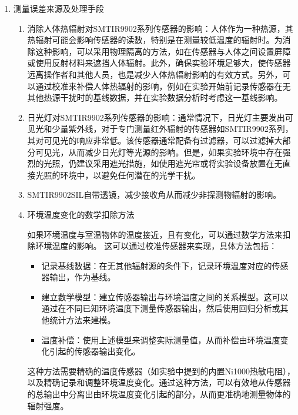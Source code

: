 \documentclass[dvipsnames, svgnames,a4paper,11pt]{article}
\begin{document}
\begin{enumerate}
\begin{enumerate}
			\item 根据讲义中的内容，尽管按照物理定律，处于室温的物体也会发出热辐射，但是当物体的温度和环境温度相同时，物体的辐射和吸收达到平衡。此时，传感器可能测得的辐射强度与环境的背景辐射强度相等，因此在没有温差的情况下，辐射体和传感器之间没有净能量交换，导致传感器输出的电压信号为零。实际上，这是因为传感器主要测量的是温差引起的辐射强度变化，而非绝对辐射强度。
			
			\item 要直接测量处于室温的物体的辐射强度，理想情况下，传感器外壳（环境）的温度应该低于被测物体的温度，以便产生足够的温差，从而使传感器能够检测到由被测物体向环境（或传感器）发出的净辐射。通过增加环境和物体之间的温差，可以增加传感器的输出信号，使其能够测量到来自物体的辐射。
		\end{enumerate}
		
		\item 测量误差来源及处理手段
		\begin{enumerate}
			\item 消除人体热辐射对SMTIR9902系列传感器的影响：人体作为一种热源，其热辐射可能会影响传感器的读数，特别是在测量较低温度的辐射时。为消除这种影响，可以采用物理隔离的方法，如在传感器与人体之间设置屏障或使用反射材料来遮挡人体辐射。此外，确保实验环境足够大，使传感器远离操作者和其他人员，也是减少人体热辐射影响的有效方式。另外，可以通过校准来补偿人体热辐射的影响，例如在实验开始前记录传感器在无其他热源干扰时的基线数据，并在实验数据分析时考虑这一基线影响。
			
			\item 日光灯对SMTIR9902系列传感器的影响：通常情况下，日光灯主要发出可见光和少量紫外线，对于专门测量红外辐射的传感器如SMTIR9902系列，其对可见光的响应非常低。该传感器通常配备有过滤器，可以过滤掉大部分可见光，从而减少日光灯等光源的影响。但是，如果实验环境中存在强烈的光照，仍建议采用遮光措施，如使用遮光帘或将实验设备放置在无直接光照的环境中，以避免任何潜在的光学干扰。
			
			\item SMTIR9902SIL自带透镜，减少接收角从而减少非探测物辐射的影响。
			
			\item 环境温度变化的数学扣除方法
			
			如果环境温度与室温物体的温度接近，且有变化，可以通过数学方法来扣除环境温度的影响。
			这可以通过校准传感器来实现，具体方法包括：
			\begin{itemize}
				\item 记录基线数据：在无其他辐射源的条件下，记录环境温度对应的传感器输出，作为基线。
				\item 建立数学模型：建立传感器输出与环境温度之间的关系模型。这可以通过在不同已知环境温度下测量传感器输出，然后使用回归分析或其他统计方法来建模。
				\item 温度补偿：使用上述模型来调整实际测量值，从而补偿由环境温度变化引起的传感器输出变化。
			\end{itemize}
			这种方法需要精确的温度传感器（如实验中提到的内置Ni1000热敏电阻），以及精确记录和调整环境温度变化。通过这种方法，可以有效地从传感器的总输出中分离出由环境温度变化引起的部分，从而更准确地测量物体的辐射强度。
	
		\end{enumerate}
	\end{enumerate}
	
\end{document}
